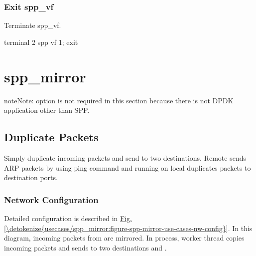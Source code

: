 \documentclass[a4paper,11pt,openany,oneside,english]{sphinxmanual}
\begin{document}
\subsubsection{Exit spp\_vf}
\label{\detokenize{usecases/spp_vf:exit-spp-vf}}
Terminate spp\_vf.

\begin{sphinxVerbatim}[commandchars=\\\{\},formatcom=\footnotesize]
\PYGZsh{} terminal 2
spp \PYGZgt{} vf 1; exit
\end{sphinxVerbatim}


\section{spp\_mirror}
\label{\detokenize{usecases/spp_mirror:spp-mirror}}\label{\detokenize{usecases/spp_mirror:spp-usecases-mirror}}\label{\detokenize{usecases/spp_mirror::doc}}
\begin{sphinxadmonition}{note}{Note:}
 option is not required in this section because there is
not DPDK application other than SPP.
\end{sphinxadmonition}


\subsection{Duplicate Packets}
\label{\detokenize{usecases/spp_mirror:duplicate-packets}}
Simply duplicate incoming packets and send to two destinations.
Remote  sends ARP packets by using ping command and
 running on local  duplicates packets to
destination ports.


\subsubsection{Network Configuration}
\label{\detokenize{usecases/spp_mirror:network-configuration}}
Detailed configuration is described in
\hyperref[\detokenize{usecases/spp_mirror:figure-spp-mirror-use-cases-nw-config}]{Fig.\@ \ref{\detokenize{usecases/spp_mirror:figure-spp-mirror-use-cases-nw-config}}}.
In this diagram, incoming packets from  are mirrored.
In  process, worker thread  copies incoming packets and
sends to two destinations  and .
\end{document}
